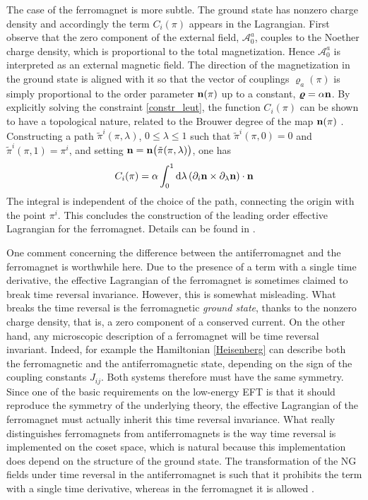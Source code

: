 \documentclass[final,3p,times,12pt,a4paper,sort&compress]{elsarticle}
\newcommand\AAA{\mathscr{A}}                %
\newcommand\vek[1]{{\boldsymbol{\bf #1}}}   %
\newcommand\de{\partial}
\newcommand\vr{\varrho}
\newcommand\dd{\mathop{{\rm d}\!}\nolimits} %
\begin{document}
The case of the ferromagnet is more subtle. The ground state has nonzero charge
density and accordingly the term $C_i(\pi)$ appears in the Lagrangian. First
observe that the zero component of the external field, $\AAA_0^a$, couples to
the Noether charge density, which is proportional to the total magnetization.
Hence $\AAA_0^a$ is interpreted as an external magnetic field. The direction of
the magnetization in the ground state is aligned with it so that the
vector of couplings $\vr_a(\pi)$ is simply proportional to the order parameter
$\vek n(\pi)$ up to a constant, $\vek\vr=\alpha\vek n$. By explicitly solving
the constraint \eqref{constr_leut}, the function $C_i(\pi)$ can be shown to
have a topological nature, related to the Brouwer degree of the map $\vek
n(\pi)$ \cite{Leutwyler:1993gf}. Constructing a path $\tilde\pi^i(\pi,\lambda)$,
$0\leq\lambda\leq1$ such that $\tilde\pi^i(\pi,0)=0$ and
$\tilde\pi^i(\pi,1)=\pi^i$, and setting $\vek n=\vek
n\bigl(\tilde\pi(\pi,\lambda)\bigr)$, one has
\begin{equation}
C_i(\pi)=\alpha\int_0^1\dd\lambda\,(\de_i\vek n\times\de_\lambda\vek n)
\cdot\vek n
\end{equation}
The integral is independent of the choice of the path, connecting the origin
with the point $\pi^i$.  This concludes the construction of the leading order
effective Lagrangian for the ferromagnet. Details can be found in
\cite{Leutwyler:1993gf}.

One comment concerning the difference between the antiferromagnet and the
ferromagnet is worthwhile here. Due to the presence of a term with a single
time derivative, the effective Lagrangian of the ferromagnet is sometimes
claimed to break time reversal invariance. However, this is somewhat
misleading. What breaks the time reversal is the ferromagnetic \emph{ground
state}, thanks to the nonzero charge density, that is, a zero component of a
conserved current. On the other hand, any microscopic description of a
ferromagnet will be time reversal invariant. Indeed, for example the
Hamiltonian \eqref{Heisenberg} can describe both the ferromagnetic and the
antiferromagnetic state, depending on the sign of the coupling constants
$J_{ij}$. Both systems therefore must have the same symmetry. Since one of the
basic requirements on the low-energy EFT is that it should reproduce the
symmetry of the underlying theory, the effective Lagrangian of the ferromagnet
must actually inherit this time reversal invariance. What really distinguishes
ferromagnets from antiferromagnets is the way time reversal is implemented on
the coset space, which is natural because this implementation does depend on
the structure of the ground state. The transformation of the NG fields under
time reversal in the antiferromagnet is such that it prohibits the term with a
single time derivative, whereas in the ferromagnet it is allowed
\cite{Roman:1999ro}.
\end{document}
